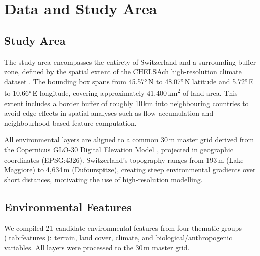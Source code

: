\section{Data and Study Area}
\label{sec:data}

\subsection{Study Area}
\label{sec:study-area}

The study area encompasses the entirety of Switzerland and a surrounding buffer 
zone, defined by the spatial extent of the CHELSAch high-resolution climate 
dataset \citep{CHELSAch}. The bounding box spans from 45.57°\,N to 48.07°\,N 
latitude and 5.72°\,E to 10.66°\,E longitude, covering approximately 
41,400\,km\textsuperscript{2} of land area. This extent includes a border buffer 
of roughly 10\,km into neighbouring countries to avoid edge effects in spatial 
analyses such as flow accumulation and neighbourhood-based feature computation.

All environmental layers are aligned to a common 30\,m master grid derived from 
the Copernicus GLO-30 Digital Elevation Model \citep{CopernicusDEM}, projected 
in geographic coordinates (EPSG:4326). Switzerland's topography ranges from 
193\,m (Lake Maggiore) to 4,634\,m (Dufourspitze), creating steep environmental 
gradients over short distances, motivating the use of high-resolution modelling.

\subsection{Environmental Features}
\label{sec:features}

We compiled 21 candidate environmental features from four thematic groups 
(\cref{tab:features}): terrain, land cover, climate, and biological/anthropogenic 
variables. All layers were processed to the 30\,m master grid.

